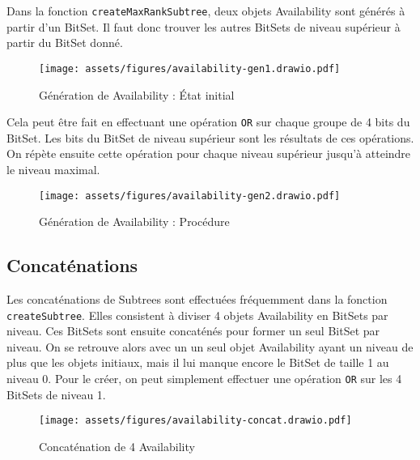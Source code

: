 Dans la fonction \texttt{createMaxRankSubtree}, deux objets Availability sont générés à partir d'un BitSet. Il faut donc trouver les autres BitSets de niveau supérieur à partir du BitSet donné.

\begin{figure}[H]
    \centering
    \texttt{[image: assets/figures/availability-gen1.drawio.pdf]}
    \caption{Génération de Availability : État initial}
    \label{fig:availability-gen1}
\end{figure}

Cela peut être fait en effectuant une opération \texttt{OR} sur chaque groupe de 4 bits du BitSet. Les bits du BitSet de niveau supérieur sont les résultats de ces opérations. On répète ensuite cette opération pour chaque niveau supérieur jusqu'à atteindre le niveau maximal.

\begin{figure}[H]
    \centering
    \texttt{[image: assets/figures/availability-gen2.drawio.pdf]}
    \caption{Génération de Availability : Procédure}
    \label{fig:availability-gen2}
\end{figure}

\newpage
\subsection{Concaténations}

Les concaténations de Subtrees sont effectuées fréquemment dans la fonction \texttt{createSubtree}. Elles consistent à diviser 4 objets Availability en BitSets par niveau. Ces BitSets sont ensuite concaténés pour former un seul BitSet par niveau. On se retrouve alors avec un un seul objet Availability ayant un niveau de plus que les objets initiaux, mais il lui manque encore le BitSet de taille 1 au niveau 0. Pour le créer, on peut simplement effectuer une opération \texttt{OR} sur les 4 BitSets de niveau 1.

\begin{figure}[H]
    \centering
    \texttt{[image: assets/figures/availability-concat.drawio.pdf]}
    \caption{Concaténation de 4 Availability}
    \label{fig:availability-concat}
\end{figure}

